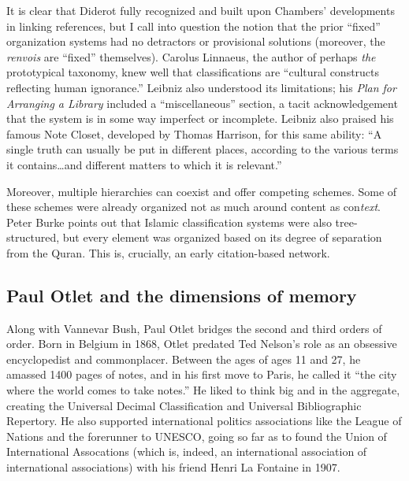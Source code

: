 It is clear that Diderot fully recognized and built upon Chambers' developments in linking references, but I call into question the notion that the prior ``fixed'' organization systems had no detractors or provisional solutions (moreover, the \emph{renvois} are ``fixed'' themselves). Carolus Linnaeus, the author of perhaps \emph{the} prototypical taxonomy, knew well that classifications are ``cultural constructs reflecting human ignorance.''\autocite[99]{zimmer_renvois_2009} Leibniz also understood its limitations; his \emph{Plan for Arranging a Library} included a ``miscellaneous'' section, a tacit acknowledgement that the system is in some way imperfect or incomplete.\autocite[106]{burke_social_2000} Leibniz also praised his famous Note Closet, developed by Thomas Harrison, for this same ability: ``A single truth can usually be put in different places, according to the various terms it contains\ldots and different matters to which it is relevant.''\autocite[``Managing Abundant Notes'']{blair_too_2010}

Moreover, multiple hierarchies can coexist and offer competing schemes. Some of these schemes were already organized not as much around content as con\emph{text}. Peter Burke points out that Islamic classification systems were also tree-structured, but every element was organized based on its degree of separation from the Quran.\autocite[94]{burke_social_2000} This is, crucially, an early citation-based network.

\subsection{Paul Otlet and the dimensions of memory}

Along with Vannevar Bush, Paul Otlet bridges the second and third orders of order. Born in Belgium in 1868, Otlet predated Ted Nelson's role as an obsessive encyclopedist and commonplacer. Between the ages of ages 11 and 27, he amassed 1400 pages of notes, and in his first move to Paris, he called it ``the city where the world comes to take notes.''\autocite{_limited_2001}  He liked to think big and in the aggregate, creating the Universal Decimal Classification and Universal Bibliographic Repertory. He also supported international politics associations like the League of Nations and the forerunner to UNESCO, going so far as to found the Union of International Assocations (which is, indeed, an international association of international associations) with his friend Henri La Fontaine in 1907.

